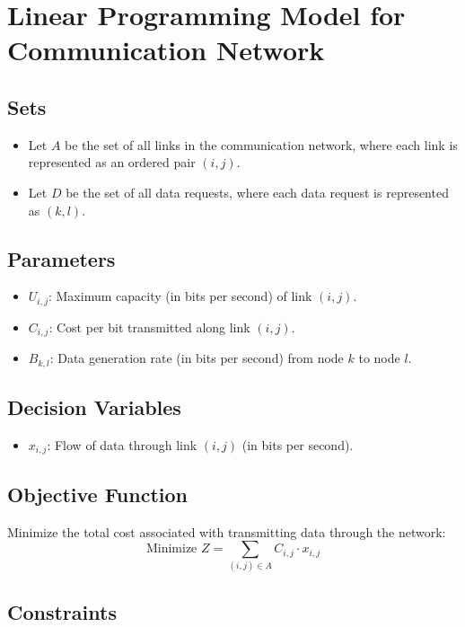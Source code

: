 \documentclass{article}
\begin{document}
\section*{Linear Programming Model for Communication Network}

\subsection*{Sets}
\begin{itemize}
    \item Let \( A \) be the set of all links in the communication network, where each link is represented as an ordered pair \( (i,j) \).
    \item Let \( D \) be the set of all data requests, where each data request is represented as \( (k,l) \).
\end{itemize}

\subsection*{Parameters}
\begin{itemize}
    \item \( U_{i,j} \): Maximum capacity (in bits per second) of link \( (i,j) \).
    \item \( C_{i,j} \): Cost per bit transmitted along link \( (i,j) \).
    \item \( B_{k,l} \): Data generation rate (in bits per second) from node \( k \) to node \( l \).
\end{itemize}

\subsection*{Decision Variables}
\begin{itemize}
    \item \( x_{i,j} \): Flow of data through link \( (i,j) \) (in bits per second).
\end{itemize}

\subsection*{Objective Function}
Minimize the total cost associated with transmitting data through the network:
\[
\text{Minimize } Z = \sum_{(i,j) \in A} C_{i,j} \cdot x_{i,j}
\]

\subsection*{Constraints}
\end{document}
